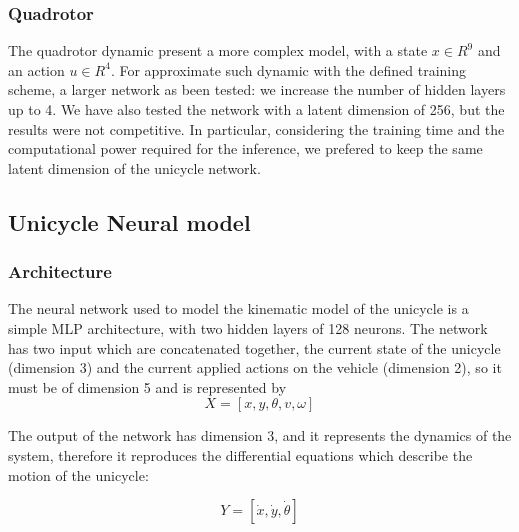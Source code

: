\subsubsection{Quadrotor}
The quadrotor dynamic present a more complex model, with a state $x \in R^9$ and an action $u \in R^4$. For approximate such dynamic with the defined training scheme, 
a larger network as been tested: we increase the number of hidden layers up to 4. We have also tested the network with a latent dimension of 256, but the results were not competitive. 
In particular, considering the training time and the computational power required for the inference, we prefered to keep the same latent dimension of the unicycle network.


\subsection{Unicycle Neural model}
\subsubsection{Architecture}
The neural network used to model the kinematic model of the unicycle is a simple MLP architecture,
with two hidden layers of 128 neurons. The network has two input which are concatenated together,
the current state of the unicycle (dimension 3) and the current applied actions on the vehicle (dimension 2),
so it must be of dimension 5 and is represented by 
\begin{equation}
    X = [x, y, \theta, v, \omega]
\end{equation}

The output of the network has dimension 3, and it represents the dynamics of the system, therefore it reproduces 
the differential equations which describe the motion of the unicycle:

\begin{equation}
    Y = [\dot{x}, \dot{y}, \dot{\theta}]
\end{equation}

